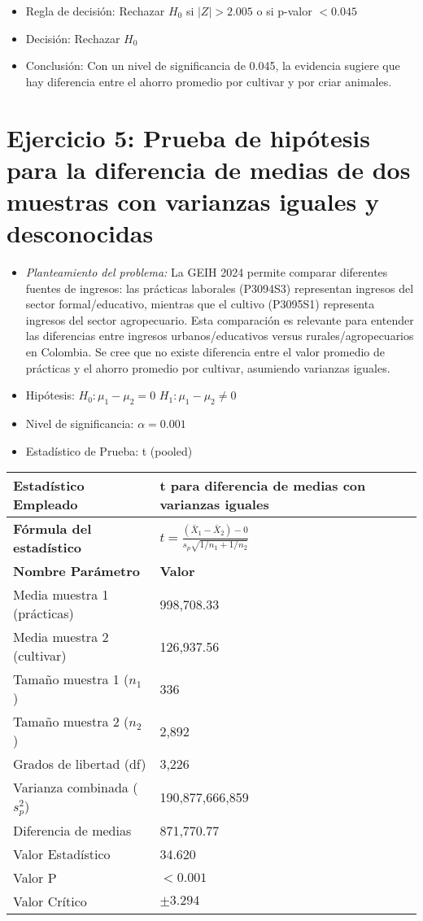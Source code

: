 \documentclass[12pt,a4paper]{article}
\begin{document}
\begin{itemize}
    \item Regla de decisión: Rechazar $H_0$ si $|Z| > 2.005$ o si p-valor $< 0.045$
    \item Decisión: Rechazar $H_0$
    \item Conclusión: Con un nivel de significancia de 0.045, la evidencia sugiere que hay diferencia entre el ahorro promedio por cultivar y por criar animales.
\end{itemize}

\section*{Ejercicio 5: Prueba de hipótesis para la diferencia de medias de dos muestras con varianzas iguales y desconocidas}
\begin{itemize}
    \item \textit{Planteamiento del problema:} La GEIH 2024 permite comparar diferentes fuentes de ingresos: las prácticas laborales (P3094S3) representan ingresos del sector formal/educativo, mientras que el cultivo (P3095S1) representa ingresos del sector agropecuario. Esta comparación es relevante para entender las diferencias entre ingresos urbanos/educativos versus rurales/agropecuarios en Colombia. Se cree que no existe diferencia entre el valor promedio de prácticas y el ahorro promedio por cultivar, asumiendo varianzas iguales.
    \item Hipótesis: \quad $H_{0}: \mu_1 - \mu_2 = 0$ \hspace{2cm} $H_{1}: \mu_1 - \mu_2 \neq 0$
    \item Nivel de significancia: $\alpha = 0.001$
    \item Estadístico de Prueba: t (pooled)
\end{itemize}

\begin{tabular}{|m{7cm}|m{7cm}|}
\hline
\textbf{Estadístico Empleado} & t para diferencia de medias con varianzas iguales \\ \hline
\textbf{Fórmula del estadístico} & $t = \frac{(\bar{X}_1 - \bar{X}_2) - 0}{s_p\sqrt{1/n_1 + 1/n_2}}$ \\ \hline
\textbf{Nombre Parámetro} & \textbf{Valor} \\ \hline
Media muestra 1 (prácticas) & 998,708.33 \\ \hline
Media muestra 2 (cultivar) & 126,937.56 \\ \hline
Tamaño muestra 1 ($n_1$) & 336 \\ \hline
Tamaño muestra 2 ($n_2$) & 2,892 \\ \hline
Grados de libertad (df) & 3,226 \\ \hline
Varianza combinada ($s_p^2$) & 190,877,666,859 \\ \hline
Diferencia de medias & 871,770.77 \\ \hline
Valor Estadístico & 34.620 \\ \hline
Valor P & $< 0.001$ \\ \hline
Valor Crítico & $\pm 3.294$ \\ \hline
\end{tabular}
\end{document}
